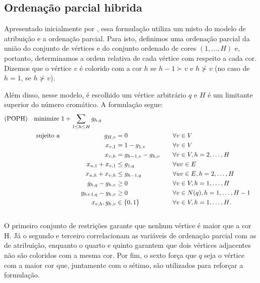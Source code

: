 \documentclass[11pt]{article}
\providecommand{\DIFaddbegin}{} %
\providecommand{\DIFaddend}{} %
\newcommand{\DIFaddincludegraphics}[2][]{{\color{blue}\fbox{\DIFOincludegraphics[#1]{#2}}}} %
\DeclareRobustCommand{\DIFaddbegin}{\DIFOaddbegin \let\includegraphics\DIFaddincludegraphics} %
\DeclareRobustCommand{\DIFaddend}{\DIFOaddend \let\includegraphics\DIFOincludegraphics} %
\begin{document}
\subsection{Ordenação parcial hibrida}
 \DIFaddbegin \label{sec:org7825c75}
\DIFaddend Apresentado inicialmente por \textcite{Jabrayilov2018NewIntegerLinear}, essa formulação utiliza um misto do modelo de atribuição e a ordenação parcial.
Para isto, definimos uma ordenação parcial da união do conjunto de vértices e do conjunto ordenado de cores \((1, \dots, H)\) e, portanto, determinamos a ordem relativa de cada vértice com respeito a cada cor.
Dizemos que o vértice \(v\) é colorido com a cor \(h\) se \(h-1 \succ v\) e \(h \nsucc v\) (no caso de \(h=1\), se \(h \nsucc v\)).

Além disso, nesse modelo, é escolhido um vértice arbitrário \(q\) e \(H\) é um limitante superior do número cromático.
A formulação segue:
\begin{alignat*}
\mathrm { (POPH) } \quad & \omit\rlap{minimize  $\displaystyle 1+\sum_{1 \leq h \leq H} g_{h, q}$} \\
& \mbox { sujeito a } && \quad & g_{H, v} &=0          & \quad & \forall v \in V \\
&                     &&   & x_{v, 1} &=1-g_{1, v} & \quad & \forall v \in V \\
&                     &&   & x_{v, h} &=g_{h-1, v}-g_{h, v} & \quad & \forall v \in V, h=2, \ldots, H \\
&                     &&   & x_{u, 1}+x_{v, 1} &\leq g_{1, q} & \quad & \forall u v \in E \\
&                     &&   & x_{u, h}+x_{v, h} &\leq g_{h-1, q} & \quad & \forall u v \in E, h=2, \ldots, H \\
&                     &&   & g_{h, q}-g_{h, v} &\geq 0 & \quad & \forall v \in V, h=1, \ldots, H \\
&                     &&   & g_{h+1, q}-g_{h, v} &\geq 0 & \quad & \forall v \in N(q), h=1, \ldots, H-1 \\
&                     &&   & x_{v, h}, g_{h, v} &\in\{0,1\} & \quad & \forall v \in V, h=1, \ldots, H \text {. } \\
&                     &&   &
\end{alignat*}
O primeiro conjunto de restrições garante que nenhum vértice é maior que a cor H.
Já o segundo e terceiro correlacionam as variáveis de ordenação parcial com as de atribuição, enquanto  o quarto e quinto garantem que dois vértices adjacentes não são coloridos com a mesma cor.
Por fim, o sexto força que \(q\) seja o vértice com a maior cor que, juntamente com o sétimo, são utilizados para reforçar a formulação.
\end{document}
